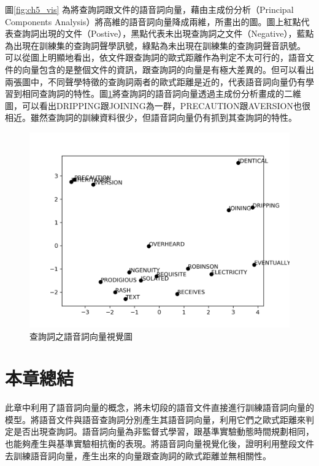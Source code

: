 圖\ref{fig:ch5_vis} 為將查詢詞跟文件的語音詞向量，藉由主成份分析（Principal
Components
Analysis）\cite{dunteman1989principal}將高維的語音詞向量降成兩維，所畫出的圖。圖上紅點代表查詢詞出現的文件（Postive），黑點代表未出現查詢詞之文件（Negative），藍點為出現在訓練集的查詢詞聲學訊號，綠點為未出現在訓練集的查詢詞聲音訊號。
可以從圖上明顯地看出，依文件跟查詢詞的歐式距離作為判定不太可行的，語音文件的向量包含的是整個文件的資訊，跟查詢詞的向量是有極大差異的。但可以看出兩張圖中，不同聲學特徵的查詢詞兩者的歐式距離是近的，代表語音詞向量仍有學習到相同查詢詞的特性。圖\ref{ch5_query_vis}將查詢詞的語音詞向量透過主成份分析畫成的二維圖，可以看出DRIPPING跟JOINING為一群，PRECAUTION跟AVERSION也很相近。雖然查詢詞的訓練資料很少，但語音詞向量仍有抓到其查詢詞的特性。

\begin{figure}[h]
\centering
\includegraphics[scale=0.7]{images/ch5_query_vis.png} 
\caption{查詢詞之語音詞向量視覺圖}
\label{ch5_query_vis}
\end{figure}
\vspace{10cm}
\section{本章總結}
此章中利用了語音詞向量的概念，將未切段的語音文件直接進行訓練語音詞向量的模型。將語音文件與語音查詢詞分別產生其語音詞向量，利用它們之歐式距離來判定是否出現查詢詞。語音詞向量為非監督式學習，跟基準實驗動態時間規劃相同，也能夠產生與基準實驗相抗衡的表現。將語音詞向量視覺化後，證明利用整段文件去訓練語音詞向量，產生出來的向量跟查詢詞的歐式距離並無相關性。
